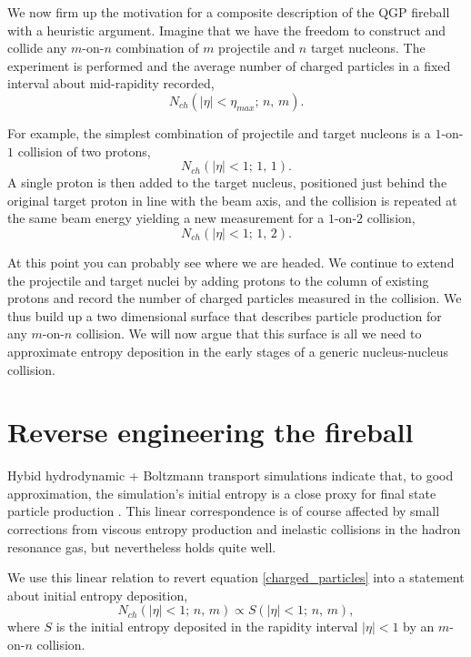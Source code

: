 \documentclass[aps,prc,reprint,amsmath,nofootinbib]{revtex4-1}
\begin{document}
We now firm up the motivation for a composite description of the QGP fireball with a heuristic argument. Imagine that we have the freedom to construct and collide any 
$m$-on-$n$ combination of $m$ projectile and $n$ target nucleons. The experiment is performed and the average number of charged particles in a fixed 
interval about mid-rapidity recorded,
\begin{equation}
 \label{charged_particles}
 N_{ch}(|\eta|<\eta_{max};\, n,\, m).
\end{equation}

For example, the simplest combination of projectile and target nucleons is a $1$-on-$1$ collision of two protons,
\begin{equation}
 N_{ch}(|\eta|<1;\, 1,\, 1).
\end{equation}
A single proton is then added to the target nucleus, positioned just behind the original target proton in line with the beam axis, and the collision is repeated at the 
same beam energy yielding a new measurement for a $1$-on-$2$ collision,
\begin{equation}
 N_{ch}(|\eta|<1;\, 1,\, 2).
\end{equation}

At this point you can probably see where we are headed. We continue to extend the projectile and target nuclei by adding  protons to the column of existing protons 
and record the number of charged particles measured in the collision. We thus build up a two dimensional surface that describes particle production for any $m$-on-$n$ 
collision. We will now argue that this surface is all we need to approximate entropy deposition in the early stages of a generic nucleus-nucleus collision. 

\section{Reverse engineering the fireball}

Hybid hydrodynamic + Boltzmann transport simulations indicate that, to good approximation, the simulation's initial entropy is a close proxy for final state particle 
production \cite{Heinz}. This linear correspondence is of course affected by small corrections from viscous entropy production and inelastic collisions in the hadron 
resonance gas, but nevertheless holds quite well. 

We use this linear relation to revert equation \ref{charged_particles} into a statement about initial entropy deposition,
\begin{equation}
 \label{entropy_mapping}
 N_{ch}(|\eta|<1;\, n,\, m) \propto S(|\eta|<1;\, n,\, m),
\end{equation}
where $S$ is the initial entropy deposited in the rapidity interval $|\eta|<1$ by an $m$-on-$n$ collision. 
\end{document}
